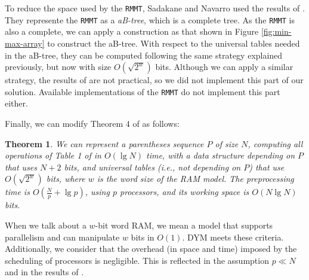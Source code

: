 To reduce the space used by the {\tt RMMT}, Sadakane and Nava\-rro used
the results of \cite{Patrascu:2008:SUC:1470582.1470670}. They
represente the {\tt RMMT} as a \emph{aB-tree}, which is a complete
tree. As the {\tt RMMT} is also a complete, we can apply a
construction as that shown in Figure \ref{fig:min-max-array} to
construct the aB-tree. With respect to the universal tables needed in
the aB-tree, they can be computed following the same strategy
explained previously, but now with size $O(\sqrt{2^{w}})$
bits. Although we can apply a similar strategy, the results of
\cite{Patrascu:2008:SUC:1470582.1470670} are not practical, so we did
not implement this part of our solution. Available implementations of
the {\tt RMMT} do not implement this part either.

Finally, we can modify Theorem 4 of
\cite{Navarro:2014:FFS:2620785.2601073} as follows:

\newtheorem{theorem}{Theorem}
\begin{theorem}
  We can represent a parentheses sequence $P$ of size $N$, computing all
  operations of Table 1 of \cite{Navarro:2014:FFS:2620785.2601073}
  in $O(\lg N)$ time, with a data
  structure depending on $P$ that uses $N+2$ bits, and universal
  tables (i.e., not depending on $P$) that use $O(\sqrt{2^{w}})$
  bits, where $w$ is the word size of the RAM model. The preprocessing
  time is $O(\frac{N}{p} + \lg p)$, using $p$
  processors, and its working space is $O(N\lg N)$ bits.
\end{theorem}
			
When we talk about a $w$-bit word RAM, we mean a model that supports
parallelism and can manipulate $w$ bits in $O(1)$. DYM meets these
criteria. Additionally, we consider that the overhead (in space and
time) imposed by the scheduling of processors is negligible. This is
reflected in the assumption $p\ll N$ and in the results of
\cite{Blumofe:1999:SMC:324133.324234}.

